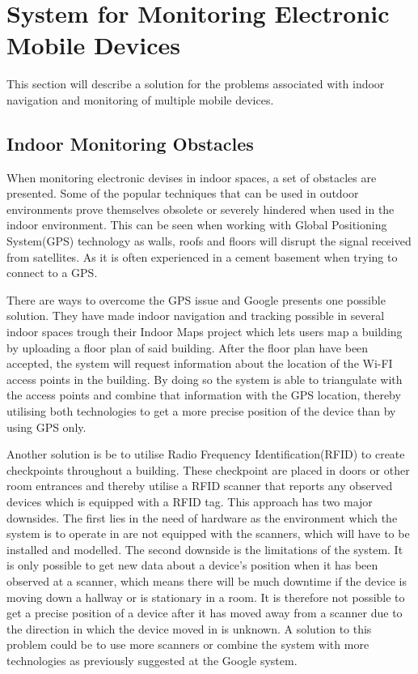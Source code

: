 \section{System for Monitoring Electronic Mobile Devices}\label{sec:monitoring}
This section will describe a solution for the problems associated with indoor navigation and monitoring of multiple mobile devices.    

\subsection{Indoor Monitoring Obstacles}
When monitoring electronic devises in indoor spaces, a set of obstacles are presented. Some of the popular techniques that can be used in outdoor environments prove themselves obsolete or severely hindered when used in the indoor environment. This can be seen when working with Global Positioning System(GPS) technology as walls, roofs and floors will disrupt the signal received from satellites. As it is often experienced in a cement basement when trying to connect to a GPS.

There are ways to overcome the GPS issue and Google presents one possible solution. They have made indoor navigation and tracking possible in several indoor spaces trough their Indoor Maps project which lets users map a building by uploading a floor plan of said building. After the floor plan have been accepted, the system will request information about the location of the Wi-FI access points in the building. By doing so the system is able to triangulate with the access points and combine that information with the GPS location, thereby utilising both technologies to get a more precise position of the device than by using GPS only.

Another solution is be to utilise Radio Frequency Identification(RFID) to create checkpoints throughout a building. These checkpoint are placed in doors or other room entrances and thereby utilise a RFID scanner that reports any observed devices which is equipped with a RFID tag\cite{indoor_bin}. %
This approach has two major downsides. The first lies in the need of hardware as the environment which the system is to operate in are not equipped with the scanners, which will have to be installed and modelled. The second downside is the limitations of the system. It is only possible to get new data about a device's position when it has been observed at a scanner, which means there will be much downtime if the device is moving down a hallway or is stationary in a room. It is therefore not possible to get a precise position of a device after it has moved away from a scanner due to the direction in which the device moved in is unknown. A solution to this problem could be to use more scanners or combine the system with more technologies as previously suggested at the Google system.

